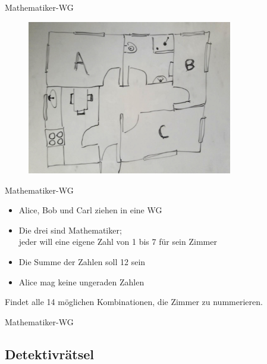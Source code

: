\documentclass{beamer}
\newcommand{\code}[1]{
	\begin{mdframed}
		
	\end{mdframed}
}
\begin{document}
\begin{frame}{Mathematiker-WG}
	\begin{figure}
		\includegraphics[width=0.8\textwidth]{images/mathematiker-wg}
	\end{figure}
\end{frame}

\begin{frame}{Mathematiker-WG}
	\begin{itemize}
		\item Alice, Bob und Carl ziehen in eine WG
		\item Die drei sind Mathematiker;\\jeder will eine eigene Zahl von 1 bis 7 für sein Zimmer
		\item Die Summe der Zahlen soll 12 sein
		\item Alice mag keine ungeraden Zahlen
	\end{itemize}

	Findet alle 14 möglichen Kombinationen, die Zimmer zu nummerieren.
\end{frame}

\begin{frame}{Mathematiker-WG}
	\code{demos/mathematiker_wg.pl}
\end{frame}

\subsection{Detektivrätsel}
\end{document}
